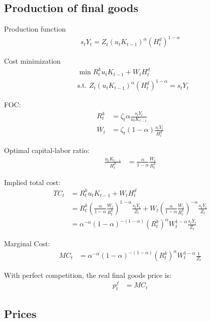 \documentclass[11pt]{article}
\begin{document}
\subsection{Production of final goods}

Production function
\begin{align*}
	s_t Y_t = Z_t (u_t K_{t-1})^{\alpha} (H_t^d)^{1-\alpha}
\end{align*}

Cost minimization
\begin{align*}
	&\min R_{t}^k u_t K_{t-1} + W_t H_t^d \\
	&\text{s.t. } Z_t (u_t K_{t-1})^{\alpha} (H_t^d)^{1-\alpha} = s_t Y_t
\end{align*}

FOC:
\begin{align*}
	R_{t}^k &= \zeta_t \alpha \frac{s_t Y_t}{u_t K_{t-1}} \\
	W_t &= \zeta_t (1-\alpha) \frac{s_t Y_t}{H_t^d}
\end{align*}

Optimal capital-labor ratio:
\begin{align*}
	\frac{u_t K_{t-1}}{H_t^d} &= \frac{\alpha}{1-\alpha}\frac{W_t}{R_{t}^k}
\end{align*}

Implied total cost:
\begin{align*}
	TC_t &= R_{t}^k u_t K_{t-1} + W_t H_t^d \\
	&=R_{t}^k \left(\frac{\alpha}{1-\alpha}\frac{W_t}{R_{t}^k}\right)^{1-\alpha} \frac{s_t Y_t}{Z_t} + W_t \left(\frac{\alpha}{1-\alpha}\frac{W_t}{R_{t}^k}\right)^{-\alpha}\frac{s_t Y_t}{Z_t} \\
	&=\alpha^{-\alpha} (1-\alpha)^{-(1-\alpha)} (R_{t}^k)^{\alpha}W_t^{1-\alpha}\frac{s_t Y_t}{Z_t} 
\end{align*}

Marginal Cost:
\begin{align*}
	MC_t &=\alpha^{-\alpha} (1-\alpha)^{-(1-\alpha)} (R_{t}^k)^{\alpha}W_t^{1-\alpha}\frac{1}{Z_t} 
\end{align*}

With perfect competition, the real final goods price is:
\begin{align*}
	p_t^f &=MC_t
\end{align*}

\subsection{Prices}
\end{document}
